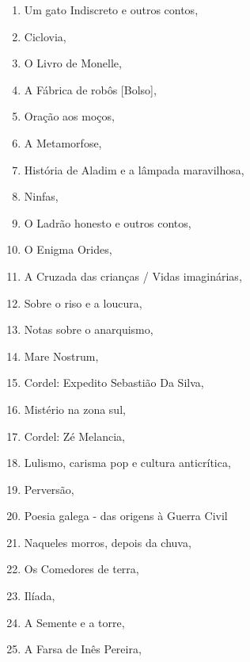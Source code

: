 \begin{multicols}{2}
\begin{enumerate}
\item Um gato Indiscreto e outros contos, {}
\item Ciclovia, {}
\item O Livro de Monelle, {}
\item A Fábrica de robôs [Bolso], {}
\item Oração aos moços, {}
\item A Metamorfose, {}
\item História de Aladim e a lâmpada maravilhosa, {}
\item Ninfas, {}
\item O Ladrão honesto e outros contos, {}
\item O Enigma Orides, {}
\item A Cruzada das crianças / Vidas imaginárias, {}
\item Sobre o riso e a loucura, {}
\item Notas sobre o anarquismo, {}
\item Mare Nostrum, {}
\item Cordel: Expedito Sebastião Da Silva, {}
\item Mistério na zona sul, {}
\item Cordel: Zé Melancia, {}
\item Lulismo, carisma pop e cultura anticrítica, {}
\item Perversão, {}
\item Poesia galega - das origens à Guerra Civil
\item Naqueles morros, depois da chuva, {}
\item Os Comedores de terra, {}
\item Ilíada, {}
\item A Semente e a torre, {}
\item A Farsa de Inês Pereira, {}

\end{enumerate}
\end{multicols}
